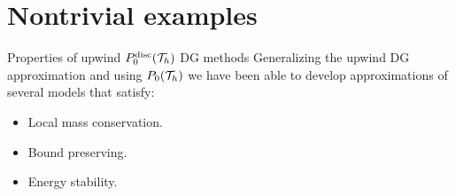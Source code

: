 	\section{Nontrivial examples}
		\begin{frame}{Properties of upwind $\relax{P}^{\text{disc}}_0(\mathcal{T}_h)$ DG methods}
		Generalizing the upwind DG approximation and using $\relax{P}_0(\mathcal{T}_h)$ we have been able to develop approximations of several models that satisfy: 
		\vspace*{0.5cm}
			\begin{itemize}\itemsep1em
				\item Local mass conservation.
				\item Bound preserving.
				\item Energy stability.
			\end{itemize}
		\end{frame}

